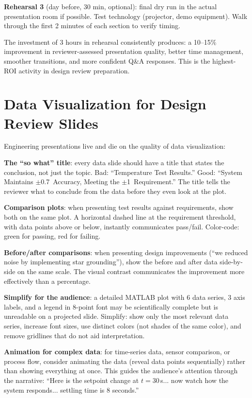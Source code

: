 \textbf{Rehearsal 3} (day before, 30 min, optional): final dry run in the actual presentation room if possible. Test technology (projector, demo equipment). Walk through the first 2 minutes of each section to verify timing.

The investment of 3 hours in rehearsal consistently produces: a 10--15\% improvement in reviewer-assessed presentation quality, better time management, smoother transitions, and more confident Q\&A responses. This is the highest-ROI activity in design review preparation.



\section{Data Visualization for Design Review Slides}
Engineering presentations live and die on the quality of data visualization:

\textbf{The ``so what'' title}: every data slide should have a title that states the conclusion, not just the topic. Bad: ``Temperature Test Results.'' Good: ``System Maintains $\pm$0.7\,\degC{} Accuracy, Meeting the $\pm$1\,\degC{} Requirement.'' The title tells the reviewer what to conclude from the data before they even look at the plot.

\textbf{Comparison plots}: when presenting test results against requirements, show both on the same plot. A horizontal dashed line at the requirement threshold, with data points above or below, instantly communicates pass/fail. Color-code: green for passing, red for failing.

\textbf{Before/after comparisons}: when presenting design improvements (``we reduced noise by implementing star grounding''), show the before and after data side-by-side on the same scale. The visual contrast communicates the improvement more effectively than a percentage.

\textbf{Simplify for the audience}: a detailed MATLAB plot with 6 data series, 3 axis labels, and a legend in 8-point font may be scientifically complete but is unreadable on a projected slide. Simplify: show only the most relevant data series, increase font sizes, use distinct colors (not shades of the same color), and remove gridlines that do not aid interpretation.

\textbf{Animation for complex data}: for time-series data, sensor comparison, or process flow, consider animating the data (reveal data points sequentially) rather than showing everything at once. This guides the audience's attention through the narrative: ``Here is the setpoint change at $t=30$\,s... now watch how the system responds... settling time is 8 seconds.''

